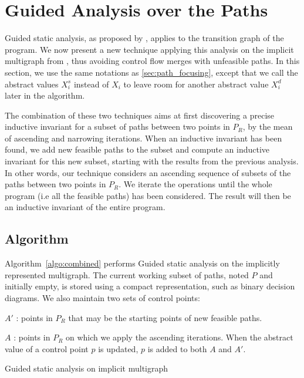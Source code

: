 \documentclass{llncs}
\begin{document}
\section{Guided Analysis over the Paths}
\label{sec:guided_multigraph}

Guided static analysis, as proposed by \cite{DBLP:conf/sas/GopanR07}, applies to the transition
graph of the program. We now present a new technique applying this analysis on the implicit
multigraph from \cite{Monniaux_Gonnord_SAS11}, thus avoiding control flow merges with
unfeasible paths.
In this section, we use the same notations as \ref{sec:path_focusing}, except
that we call the abstract values $X_i^s$ instead of $X_i$ to leave room for
another abstract value $X_i^d$ later in the algorithm.

The combination of these two techniques aims at first discovering a precise
inductive invariant for a subset of paths between two points in $P_R$, 
by the mean of ascending and narrowing iterations. When an
inductive invariant has been found, we add new feasible paths to the subset and
compute an inductive invariant for this new subset, starting with the results
from the previous analysis.
In other words, our technique considers an ascending sequence of
subsets of the paths between two points in $P_R$.
We iterate the operations until the whole program (i.e all the
feasible paths) has been considered. The result will then be an
inductive invariant of the entire program.

\subsection{Algorithm}


Algorithm~\ref{algo:combined} performs Guided static analysis on the implicitly represented multigraph.
%
The current working subset of paths, noted $P$ and initially empty, is
stored using a compact representation, such as binary decision
diagrams. We also maintain two sets of control points:
\begin{compactitem}
	\item $A'$ : points in $P_R$ that may be the starting points of new
		feasible paths.
	\item $A$ : points in $P_R$ on which we apply the ascending iterations.
	When the abstract value of a control point $p$ is updated, $p$ is
	added to both $A$ and $A'$.
\end{compactitem}

\begin{algorithm}
	\caption{Guided static analysis on implicit multigraph}
	\label{algo:combined}
	\begin{algorithmic}[1] 
	
	\end{algorithmic}
\end{algorithm}
\end{document}
